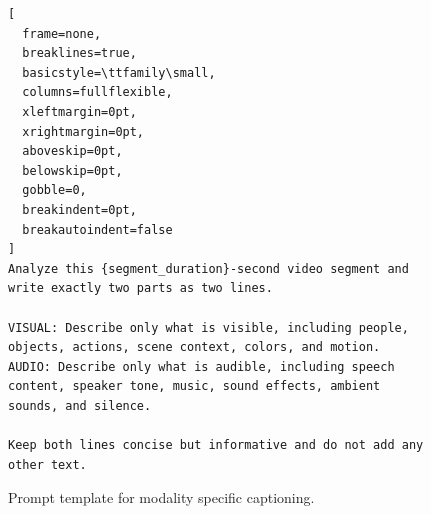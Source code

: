 \begin{figure}[t]
\centering
\begin{tcolorbox}[
  colback=blue!5!white,
  colframe=blue!75!black,
  width=\linewidth,
  arc=1mm,
  boxrule=0.8pt,
  title=\textbf{Modality Specific Captioning},
  colbacktitle=blue!75!black,
  coltitle=white,
  fonttitle=\bfseries\sffamily,
  halign title=center,
  top=4mm,
  bottom=4mm,
  left=3mm,
  right=3mm
]
\begin{lstlisting}[
  frame=none,
  breaklines=true,
  basicstyle=\ttfamily\small,
  columns=fullflexible,
  xleftmargin=0pt,
  xrightmargin=0pt,
  aboveskip=0pt,
  belowskip=0pt,
  gobble=0,
  breakindent=0pt,
  breakautoindent=false
]
Analyze this {segment_duration}-second video segment and write exactly two parts as two lines.

VISUAL: Describe only what is visible, including people, objects, actions, scene context, colors, and motion.
AUDIO: Describe only what is audible, including speech content, speaker tone, music, sound effects, ambient sounds, and silence.

Keep both lines concise but informative and do not add any other text.
\end{lstlisting}
\end{tcolorbox}
\caption{Prompt template for modality specific captioning.}
\label{fig:modality_captioning_prompt}
\end{figure}



